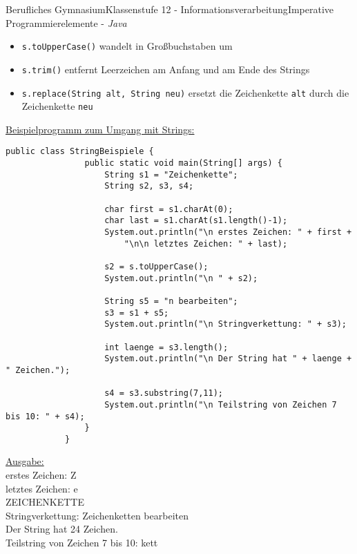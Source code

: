 \documentclass[oneside,openany,headings=optiontotoc,11pt,numbers=noenddot]{article}
\begin{document}
\begin{worksheet}{Berufliches Gymnasium}{Klassenstufe 12 - Informationsverarbeitung}{Imperative Programmierelemente - \textit{Java}}
\begin{itemize}
			\item \lstinline[style=JavaInputStyle]|s.toUpperCase()| wandelt in Großbuchstaben um
			\item \lstinline[style=JavaInputStyle]|s.trim()| entfernt Leerzeichen am Anfang und am Ende des Strings
			\item \lstinline[style=JavaInputStyle]|s.replace(String alt, String neu)| ersetzt die Zeichenkette \lstinline[style=JavaInputStyle]|alt| durch die Zeichenkette \lstinline[style=JavaInputStyle]|neu|
		\end{itemize}
		\underline{Beispielprogramm zum Umgang mit Strings:}
		\begin{lstlisting}[style=JavaInputStyle]
			public class StringBeispiele {
				public static void main(String[] args) {
					String s1 = "Zeichenkette";
					String s2, s3, s4;
					
					char first = s1.charAt(0);
					char last = s1.charAt(s1.length()-1);
					System.out.println("\n erstes Zeichen: " + first + 
						"\n\n letztes Zeichen: " + last);
						
					s2 = s.toUpperCase();
					System.out.println("\n " + s2);
					
					String s5 = "n bearbeiten";
					s3 = s1 + s5;
					System.out.println("\n Stringverkettung: " + s3);
					
					int laenge = s3.length();
					System.out.println("\n Der String hat " + laenge + " Zeichen.");
					
					s4 = s3.substring(7,11);
					System.out.println("\n Teilstring von Zeichen 7 bis 10: " + s4);
				}
			}
		\end{lstlisting}
		\underline{Ausgabe:}\\
		erstes Zeichen: Z\\
		letztes Zeichen: e\\
		ZEICHENKETTE\\
		Stringverkettung: Zeichenketten bearbeiten\\
		Der String hat 24 Zeichen.\\
		Teilstring von Zeichen 7 bis 10: kett

\end{worksheet}
\end{document}
